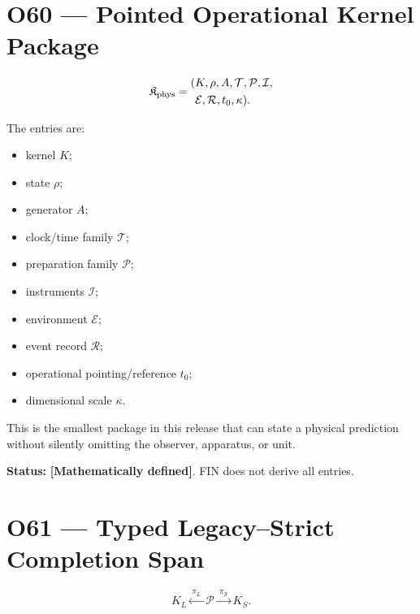 \documentclass[11pt,a4paper,openany]{report}
\begin{document}
\section{O60 --- Pointed Operational Kernel Package}

\[
\mathfrak K_{\rm phys}
=
\begin{aligned}
(&K,\rho,A,\mathcal T,\mathcal P,\mathcal I,\\
 &\mathcal E,\mathcal R,t_0,\kappa).
\end{aligned}
\]

The entries are:

\begin{itemize}
\item 
kernel \(K\);

\item 
state \(\rho\);

\item 
generator \(A\);

\item 
clock/\allowbreak{}time family \(\mathcal T\);

\item 
preparation family \(\mathcal P\);

\item 
instruments \(\mathcal I\);

\item 
environment \(\mathcal E\);

\item 
event record \(\mathcal R\);

\item 
operational pointing/\allowbreak{}reference \(t_0\);

\item 
dimensional scale \(\kappa\).

\end{itemize}

This is the smallest package in this release that can state a physical prediction without silently omitting the observer, apparatus, or unit.

\textbf{Status:} \textbf{[Mathematically defined]}. FIN does not derive all entries.

\section{O61 --- Typed Legacy--Strict Completion Span}

\[
K_L
\xleftarrow{\ \pi_L\ }
\mathcal P
\xrightarrow{\ \pi_S\ }
K_S.
\]
\end{document}
